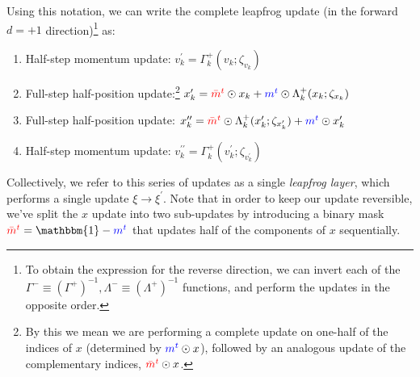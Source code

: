 \documentclass{article} %
\newcommand{\mbart}{\textcolor{red}{\bar{m}^{t}}}
\newcommand{\mt}{\textcolor{blue}{m^{t}}}
\begin{document}
Using this notation, we can write the complete leapfrog update (in the forward \(d=+1\) direction)\footnote{%
   To obtain the expression for the reverse direction, we can invert each of the
   \(\Gamma^{-}\equiv{\left(\Gamma^{+}\right)}^{-1}, \Lambda^{-}\equiv{\left(\Lambda^{+}\right)}^{-1}\) functions, and
   perform the updates in the opposite order.
} as:
%
\begin{enumerate}
   \item Half-step momentum update:%
      \hspace{29pt}\(%
         v^{\prime}_{k} = \Gamma^{+}_{k}(v_{k};\zeta_{v_{k}})%
   \)
   \item Full-step half-position update:\footnote{%
         By this we mean we are performing a complete update on one-half of the indices of \(x\) (determined by
         \(\mt\odot x\)), followed by an analogous update of the complementary indices, \(\mbart\odot x\).
   }
      \hspace{14pt} \(%
         x^{\prime}_{k} = \mbart\odot x_{k} + \mt\odot \Lambda^{+}_{k}(x_{k};\zeta_{x_{k}})
   \)
   \item Full-step half-position update:%
      \hspace{21pt} \(%
         x^{\prime\prime}_{k} = \mbart\odot\Lambda^{+}_{k}(x^{\prime}_{k};\zeta_{x^{\prime}_{k}}) + \mt\odot x^{\prime}_{k}
   \)
   \item Half-step momentum update:%
      \hspace{25pt} \(%
         v^{\prime\prime}_{k} = \Gamma_{k}^{+}(v^{\prime}_{k}; \zeta_{v^{\prime}_{k}})
   \)
\end{enumerate}
%
Collectively, we refer to this series of updates as a single \emph{leapfrog layer}, which performs a single update \(\xi\rightarrow\xi^{\prime}\).
%
Note that in order to keep our update reversible, we've split the \(x\) update into two sub-updates by
introducing a binary mask \(\mbart = \mathbbm{1} - \mt\) that updates half of the components of \(x\) sequentially.
%
%
\end{document}
